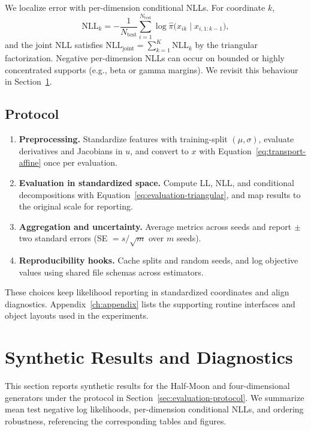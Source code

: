 \documentclass[11pt,a4paper,twoside]{book}\usepackage[]{graphicx}\usepackage[]{xcolor}
\begin{document}
We localize error with per-dimension conditional NLLs. For coordinate $k$,
\begin{equation}
 \mathrm{NLL}_k = -\frac{1}{N_{\mathrm{test}}} \sum_{i=1}^{N_{\mathrm{test}}} \log \hat{\pi}\big(x_{ik} \mid x_{i,1:k-1}\big),
 \label{eq:evaluation-conditional-nll}
\end{equation}
and the joint NLL satisfies $\mathrm{NLL}_{\mathrm{joint}} = \sum_{k=1}^{K} \mathrm{NLL}_k$ by the triangular factorization. Negative per-dimension NLLs can occur on bounded or highly concentrated supports (e.g., beta or gamma margins). We revisit this behaviour in Section~\ref{sec:synthetic-results}.


\subsection{Protocol}

\begin{enumerate}
 \item \textbf{Preprocessing.} Standardize features with training-split $(\mu, \sigma)$, evaluate derivatives and Jacobians in $u$, and convert to $x$ with Equation~\eqref{eq:transport-affine} once per evaluation.
 \item \textbf{Evaluation in standardized space.} Compute LL, NLL, and conditional decompositions with Equation~\eqref{eq:evaluation-triangular}, and map results to the original scale for reporting.
 \item \textbf{Aggregation and uncertainty.} Average metrics across seeds and report $\pm$ two standard errors (SE $= s/\sqrt{m}$ over $m$ seeds).
 \item \textbf{Reproducibility hooks.} Cache splits and random seeds, and log objective values using shared file schemas across estimators.
\end{enumerate}

These choices keep likelihood reporting in standardized coordinates and align diagnostics. Appendix~\ref{ch:appendix} lists the supporting routine interfaces and object layouts used in the experiments.
\section{Synthetic Results and Diagnostics}\label{sec:synthetic-results}

This section reports synthetic results for the Half-Moon and four-dimensional generators under the protocol in Section~\ref{sec:evaluation-protocol}. We summarize mean test negative log likelihoods, per-dimension conditional NLLs, and ordering robustness, referencing the corresponding tables and figures.
\end{document}
